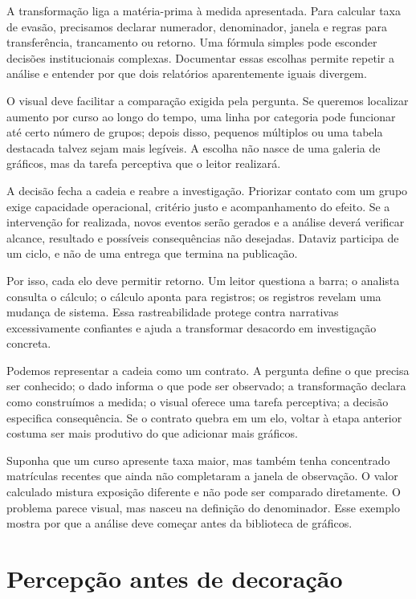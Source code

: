A transformação liga a matéria-prima à medida apresentada. Para calcular taxa de evasão, precisamos declarar numerador, denominador, janela e regras para transferência, trancamento ou retorno. Uma fórmula simples pode esconder decisões institucionais complexas. Documentar essas escolhas permite repetir a análise e entender por que dois relatórios aparentemente iguais divergem.

O visual deve facilitar a comparação exigida pela pergunta. Se queremos localizar aumento por curso ao longo do tempo, uma linha por categoria pode funcionar até certo número de grupos; depois disso, pequenos múltiplos ou uma tabela destacada talvez sejam mais legíveis. A escolha não nasce de uma galeria de gráficos, mas da tarefa perceptiva que o leitor realizará.

A decisão fecha a cadeia e reabre a investigação. Priorizar contato com um grupo exige capacidade operacional, critério justo e acompanhamento do efeito. Se a intervenção for realizada, novos eventos serão gerados e a análise deverá verificar alcance, resultado e possíveis consequências não desejadas. Dataviz participa de um ciclo, e não de uma entrega que termina na publicação.

Por isso, cada elo deve permitir retorno. Um leitor questiona a barra; o analista consulta o cálculo; o cálculo aponta para registros; os registros revelam uma mudança de sistema. Essa rastreabilidade protege contra narrativas excessivamente confiantes e ajuda a transformar desacordo em investigação concreta.

Podemos representar a cadeia como um contrato. A pergunta define o que precisa ser conhecido; o dado informa o que pode ser observado; a transformação declara como construímos a medida; o visual oferece uma tarefa perceptiva; a decisão especifica consequência. Se o contrato quebra em um elo, voltar à etapa anterior costuma ser mais produtivo do que adicionar mais gráficos.

Suponha que um curso apresente taxa maior, mas também tenha concentrado matrículas recentes que ainda não completaram a janela de observação. O valor calculado mistura exposição diferente e não pode ser comparado diretamente. O problema parece visual, mas nasceu na definição do denominador. Esse exemplo mostra por que a análise deve começar antes da biblioteca de gráficos.

\section{Percepção antes de decoração}

